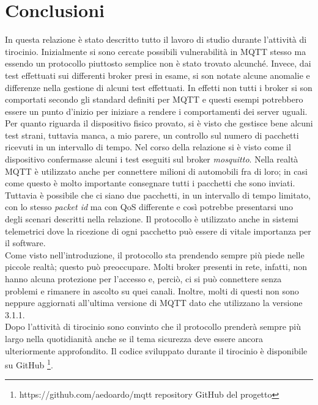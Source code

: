 \documentclass[binding=0.6cm,TFA]{sapthesis}
\begin{document}
\chapter{Conclusioni}

\begin{large}
In questa relazione è stato descritto tutto il lavoro di studio durante l'attività di tirocinio. Inizialmente si sono cercate possibili vulnerabilità in MQTT stesso ma essendo un protocollo piuttosto semplice non è stato trovato alcunché. Invece, dai test effettuati sui differenti broker presi in esame, si son notate alcune anomalie e differenze nella gestione di alcuni test effettuati. In effetti non tutti i broker si son comportati secondo gli standard definiti per MQTT e questi esempi potrebbero essere un punto d'inizio per iniziare a rendere i comportamenti dei server uguali. \\
Per quanto riguarda il dispositivo fisico provato, si è visto che gestisce bene alcuni test strani, tuttavia manca, a mio parere, un controllo sul numero di pacchetti ricevuti in un intervallo di tempo. Nel corso della relazione si è visto come il dispositivo confermasse alcuni i test eseguiti sul broker \textit{mosquitto}. 
Nella realtà MQTT è utilizzato anche per connettere milioni di automobili fra di loro; in casi come questo è molto importante consegnare tutti i pacchetti che sono inviati. Tuttavia è possibile che ci siano due pacchetti, in un intervallo di tempo limitato, con lo stesso \textit{packet id} ma con QoS differente e così potrebbe presentarsi uno degli scenari descritti nella relazione. Il protocollo è utilizzato anche in sistemi telemetrici dove la ricezione di ogni pacchetto può essere di vitale importanza per il software.\\

Come visto nell'introduzione, il protocollo sta prendendo sempre più piede nelle piccole realtà; questo può preoccupare. Molti broker presenti in rete, infatti, non hanno alcuna protezione per l'accesso e, perciò, ci si può connettere senza problemi e rimanere in ascolto su quei canali. Inoltre, molti di questi non sono neppure aggiornati all'ultima versione di MQTT dato che utilizzano la versione 3.1.1. \\


Dopo l'attività di tirocinio sono convinto che il protocollo prenderà sempre più largo nella quotidianità anche se il tema sicurezza deve essere ancora ulteriormente approfondito. Il codice sviluppato durante il tirocinio è disponibile su GitHub \footnote{https://github.com/aedoardo/mqtt repository GitHub del progetto}.
\end{large}
\end{document}
